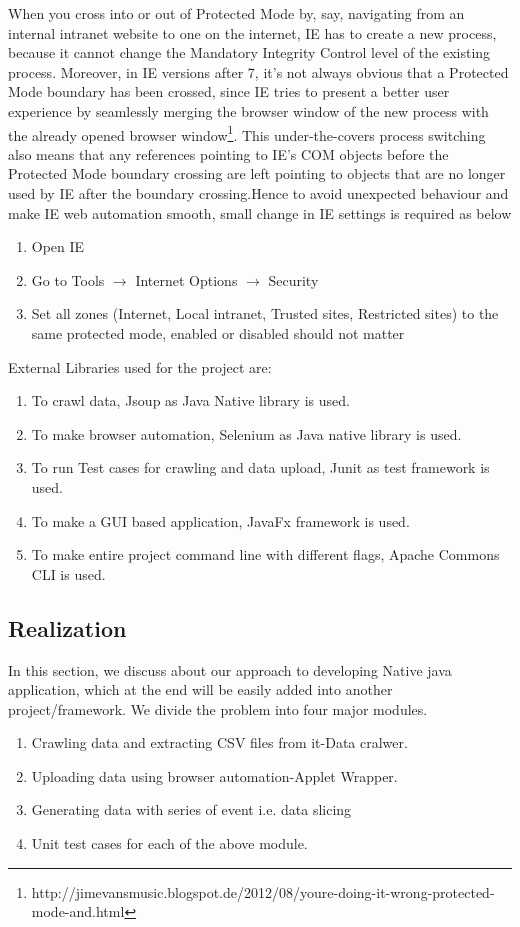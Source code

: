 \documentclass[article,type=msc,colorback,accentcolor=tud9c,twoside,11pt]{tudthesis}
\begin{document}
	When you cross into or out of Protected Mode by, say, navigating from an internal intranet website to one on the internet, IE has to create a new process, because it cannot change the Mandatory Integrity Control level of the existing process. Moreover, in IE versions after 7, it's not always obvious that a Protected Mode boundary has been crossed, since IE tries to present a better user experience by seamlessly merging the browser window of the new process with the already opened browser window\footnote{http://jimevansmusic.blogspot.de/2012/08/youre-doing-it-wrong-protected-mode-and.html}. This under-the-covers process switching also means that any references pointing to IE's COM objects before the Protected Mode boundary crossing are left pointing to objects that are no longer used by IE after the boundary crossing.Hence to avoid unexpected behaviour and make IE web automation smooth, small change in IE settings is required as below
	\begin{enumerate}
		\item Open IE
		\item Go to Tools $\rightarrow$ {Internet Options} $\rightarrow$ {Security}
		\item Set all zones (Internet, Local intranet, Trusted sites, Restricted sites) to the same protected mode, enabled or disabled should not matter
	\end{enumerate}
	External Libraries used for the project are:
	\begin{enumerate}
		\item To crawl data, Jsoup as Java Native library is used.
		\item To make browser automation, Selenium as Java native library is used.
		\item To run Test cases for crawling and data upload, Junit as test framework is used. 
		\item To make a GUI based application, JavaFx framework is used.
		\item To make entire project command line with different flags, Apache Commons CLI is used. 
	\end{enumerate}
	
	\subsection{Realization}
	In this section, we discuss about our approach to developing Native java application, which at the end will be easily added into another project/framework. We divide the problem into four major modules.
	\begin{enumerate}
		\item Crawling data and extracting CSV files from it-Data cralwer.
		\item Uploading data using browser automation-Applet Wrapper.
		\item Generating data with series of event i.e. data slicing
		\item Unit test cases for each of the above module.
		
	\end{enumerate}
	
\end{document}
